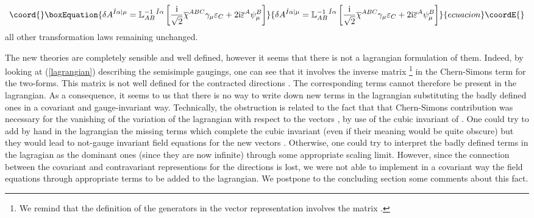 \documentclass[a4paper,12pt]{article}
\def\bar{\overline}\end {picture}}
\begin{document}
\begin{equation}\coord{}\boxEquation{
\delta A^{\hat I\alpha|\mu} = \mathbb{L}^{-1~\hat
I\alpha}_{AB}\left[ {{\rm i}\over\sqrt{2}}
\bar{\chi}^{ABC}\gamma_\mu\varepsilon_C +2{\rm
i}\bar\varepsilon^A\psi^B_\mu \right]
}{
\delta A^{\hat I\alpha|\mu} = \mathbb{L}^{-1~\hat
I\alpha}_{AB}\left[ {{\rm i}\over\sqrt{2}}
\bar{\chi}^{ABC}\gamma_\mu\varepsilon_C +2{\rm
i}\bar\varepsilon^A\psi^B_\mu \right]
}{ecuacion}\coordE{}\end{equation}
 all other transformation laws remaining unchanged.
 \par
 The new theories are completely sensible and well
 defined, however it seems that there is not a lagrangian formulation
 of them.
 Indeed, by looking at (\ref{lagrangian}) describing the semisimple
 gaugings, one can see that it involves the inverse matrix
 \coordHE{} \footnote{We remind that the definition of the
\coordHE{} generators in the vector representation involves the
matrix \coordHE{}.} in the Chern-Simons term for the two-forms.
This matrix is not well defined for the contracted directions
\coordHE{}. The corresponding terms cannot therefore be present in
the lagrangian. As a consequence, it seems to us that there is no
way to write down new terms in the lagrangian substituting the
badly defined ones in a covariant and gauge-invariant way.
Technically, the obstruction is related to the fact that that
Chern-Simons contribution was necessary for the vanishing of the
variation of the lagrangian with respect to the vectors \coordHE{},
by use of the cubic invariant of \coordHE{}. One could try to add
by hand in the lagrangian the missing terms which complete the
cubic invariant (even if their meaning would be quite obscure) but
they would lead to not-gauge invariant field equations for the new
vectors \coordHE{}. Otherwise, one could try to interpret
the badly defined terms in the lagragian as the dominant ones
(since they are now infinite) through some appropriate scaling
limit. However, since the connection between the covariant and
contravariant representions for the \coordHE{} directions is lost,
we were not able to implement in a covariant way the field
equations through appropriate terms to be added to the lagrangian.
We postpone to the concluding section some comments about this
fact.
 \par
\end{document}
